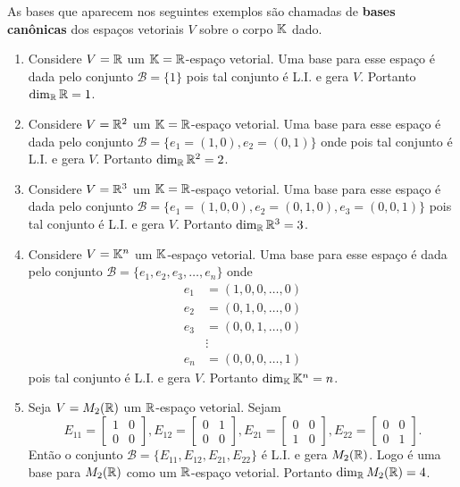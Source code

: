 As bases que aparecem nos seguintes exemplos são chamadas de \textbf{bases canônicas} dos espaços vetoriais $V$ sobre o corpo $\mathbb{K}$ dado.
\begin{exemplos}
  \begin{enumerate}
    \item Considere $V = \mathbb{R}$ um $\mathbb{K} = \mathbb{R}$-espaço vetorial. Uma base para esse espaço é dada pelo conjunto $\mathcal{B} = \{1\}$ pois tal conjunto é L.I. e gera $V$. Portanto $\dim_{\mathbb{R}}\mathbb{R} = 1$.
    
    \item Considere $V = \mathbb{R}^2$ um $\mathbb{K} = \mathbb{R}$-espaço vetorial. Uma base para esse espaço é dada pelo conjunto $\mathcal{B} = \{e_1 = (1, 0), e_2 = (0, 1)\}$ onde pois tal conjunto é L.I. e gera $V$. Portanto $\dim_{\mathbb{R}}\mathbb{R}^2 = 2$.
  
    \item Considere $V = \mathbb{R}^3$ um $\mathbb{K} = \mathbb{R}$-espaço vetorial. Uma base para esse espaço é dada pelo conjunto $\mathcal{B} = \{e_1 = (1, 0, 0), e_2 = (0, 1, 0), e_3 = (0, 0, 1)\}$ pois tal conjunto é L.I. e gera $V$. Portanto $\dim_{\mathbb{R}}\mathbb{R}^3 = 3$.

    \item Considere $V = \mathbb{K}^n$ um $\mathbb{K}$-espaço vetorial. Uma base para esse espaço é dada pelo conjunto $\mathcal{B} = \{e_1, e_2, e_3, \dots, e_n\}$ onde
      \begin{align*}
        e_1 &= (1, 0, 0, \dots, 0)\\
        e_2 &= (0, 1, 0, \dots, 0)\\
        e_3 &= (0, 0, 1, \dots, 0)\\
            &\vdots\\
        e_n &= (0, 0, 0, \dots, 1)
      \end{align*}
      pois tal conjunto é L.I. e gera $V$. Portanto $\dim_{\mathbb{K}}\mathbb{K}^n = n$.

    \item Seja $V = M_2(\mathbb{R})$ um $\mathbb{R}$-espaço vetorial. Sejam
      \[
        E_{11} = \begin{bmatrix}1 & 0\\0 & 0\end{bmatrix},
        E_{12} = \begin{bmatrix}0 & 1\\0 & 0\end{bmatrix},
        E_{21} = \begin{bmatrix}0 & 0\\1 & 0\end{bmatrix},
        E_{22} = \begin{bmatrix}0 & 0\\0 & 1\end{bmatrix}.
      \]
      Então o conjunto $\mathcal{B} = \{E_{11}, E_{12}, E_{21}, E_{22}\}$ é L.I. e gera $M_2(\mathbb{R})$. Logo é uma base para $M_2(\mathbb{R})$ como um $\mathbb{R}$-espaço vetorial. Portanto $\dim_{\mathbb{R}} M_2(\mathbb{R}) = 4$.


\end{enumerate}
\end{exemplos}
